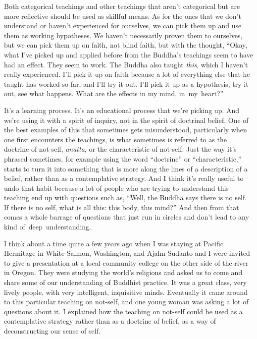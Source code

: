 Both categorical teachings and other teachings that aren't categorical but are more reflective should be used as skillful means. As for the ones that we don't understand or haven't experienced for ourselves, we can pick them up and use them as working hypotheses. We haven't necessarily proven them to ourselves, but we can pick them up on faith, not blind faith, but with the thought, ``Okay, what I've picked up and applied before from the Buddha's teachings seem to have had an effect. They seem to work. The Buddha also taught \emph{this}, which I haven't really experienced. I'll pick it up on faith because a lot of everything else that he taught has worked so far, and I'll try it out. I'll pick it up as a hypothesis, try it out, see what happens. What are the effects in my mind, \mbox{in my heart?''}

It's a learning process. It's an educational process that we're picking up. And we're using it with a spirit of inquiry, not in the spirit of doctrinal belief. One of the best examples of this that sometimes gets misunderstood, particularly when one first encounters the teachings, is what sometimes is referred to as the doctrine of not-self, \emph{anatta}, or the characteristic of not-self. Just the way it's phrased sometimes, for example using the word ``doctrine'' or ``characteristic,'' starts to turn it into something that is more along the lines of a description of a belief, rather than as a contemplative strategy. And I think it's really useful to undo that habit because a lot of people who are trying to understand this teaching end up with questions such as, ``Well, the Buddha says there is no self. If there is no self, what is all this: this body, this mind?'' And then from that comes a whole barrage of questions that just run in circles and don't lead to any kind \mbox{of deep understanding.}

I think about a time quite a few years ago when I was staying at Pacific Hermitage in White Salmon, Washington, and Ajahn Sudanto and I were invited to give a presentation at a local community college on the other side of the river in Oregon. They were studying the world's religions and asked us to come and share some of our understanding of Buddhist practice. It was a great class, very lively people, with very intelligent, inquisitive minds. Eventually it came around to this particular teaching on not-self, and one young woman was asking a lot of questions about it. I explained how the teaching on not-self could be used as a contemplative strategy rather than as a doctrine of belief, as a way of deconstructing our sense of self.

